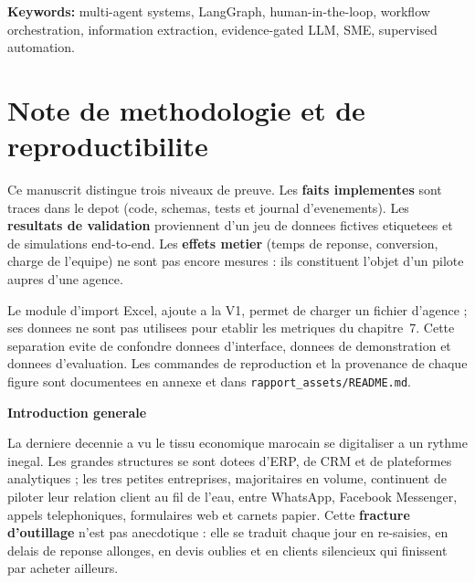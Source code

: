 \documentclass[12pt,a4paper,openany]{report}
\begin{document}
\noindent\textbf{Keywords:} multi-agent systems, LangGraph, human-in-the-loop, workflow orchestration, information extraction, evidence-gated LLM, SME, supervised automation.

\chapter*{Note de methodologie et de reproductibilite}
Ce manuscrit distingue trois niveaux de preuve. Les \textbf{faits implementes} sont traces dans le depot (code, schemas, tests et journal d'evenements). Les \textbf{resultats de validation} proviennent d'un jeu de donnees fictives etiquetees et de simulations end-to-end. Les \textbf{effets metier} (temps de reponse, conversion, charge de l'equipe) ne sont pas encore mesures : ils constituent l'objet d'un pilote aupres d'une agence.

Le module d'import Excel, ajoute a la V1, permet de charger un fichier d'agence ; ses donnees ne sont pas utilisees pour etablir les metriques du chapitre~7. Cette separation evite de confondre donnees d'interface, donnees de demonstration et donnees d'evaluation. Les commandes de reproduction et la provenance de chaque figure sont documentees en annexe et dans \texttt{rapport\_assets/README.md}.

\tableofcontents
\listoffigures
\listoftables

\cleardoublepage
{}

\vspace*{1cm}
{\noindent \Huge \bfseries \color{titleBlue} Introduction generale \par}
\vspace{1.2cm}

La derniere decennie a vu le tissu economique marocain se digitaliser a un rythme inegal. Les grandes structures se sont dotees d'ERP, de CRM et de plateformes analytiques ; les tres petites entreprises, majoritaires en volume, continuent de piloter leur relation client au fil de l'eau, entre WhatsApp, Facebook Messenger, appels telephoniques, formulaires web et carnets papier. Cette \textbf{fracture d'outillage} n'est pas anecdotique : elle se traduit chaque jour en re-saisies, en delais de reponse allonges, en devis oublies et en clients silencieux qui finissent par acheter ailleurs.
\end{document}
